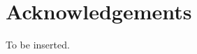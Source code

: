 \documentclass[11pt,a4paper]{article}
\theoremstyle{plain}
\theoremstyle{definition}
\theoremstyle{remark}
\begin{document}
\section*{Acknowledgements}
To be inserted.



\end{document}
